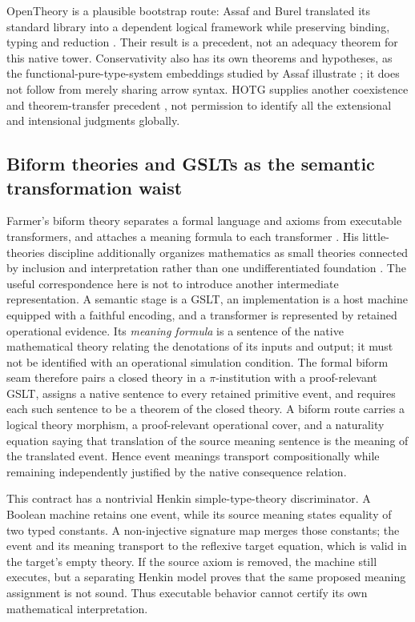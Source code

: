 \documentclass[11pt]{article}
\theoremstyle{definition}
\theoremstyle{remark}
\begin{document}
OpenTheory is a plausible bootstrap route: Assaf and Burel translated its
standard library into a dependent logical framework while preserving binding,
typing and reduction \cite{AssafBurelHOL}. Their result is a precedent, not
an adequacy theorem for this native tower. Conservativity also has its own
theorems and hypotheses, as the functional-pure-type-system embeddings studied
by Assaf illustrate \cite{AssafConservativity}; it does not follow from merely
sharing arrow syntax. HOTG supplies another coexistence and theorem-transfer
precedent \cite{BrownKaliszykPakHOTG}, not permission to identify all the
extensional and intensional judgments globally.

\subsection{Biform theories and GSLTs as the semantic transformation waist}
\label{sec:biform-gslt}

Farmer's biform theory separates a formal language and axioms from executable
transformers, and attaches a meaning formula to each transformer
\cite{CaretteFarmerSharodaBiform,FarmerMohrenschildtTransformers}.  His
little-theories discipline additionally organizes mathematics as small theories
connected by inclusion and interpretation rather than one undifferentiated
foundation \cite{FarmerLittleTheories}.  The useful
correspondence here is not to introduce another intermediate representation.
A semantic stage is a GSLT, an implementation is a host machine equipped with a
faithful encoding, and a transformer is represented by retained operational
evidence.  Its \emph{meaning formula} is a sentence of the native mathematical
theory relating the denotations of its inputs and output; it must not be
identified with an operational simulation condition.  The formal biform seam
therefore pairs a closed theory in a $\pi$-institution with a proof-relevant
GSLT, assigns a native sentence to every retained primitive event, and requires
each such sentence to be a theorem of the closed theory.  A biform route carries
a logical theory morphism, a proof-relevant operational cover, and a naturality
equation saying that translation of the source meaning sentence is the meaning
of the translated event.  Hence event meanings transport compositionally while
remaining independently justified by the native consequence relation.

This contract has a nontrivial Henkin simple-type-theory discriminator.  A
Boolean machine retains one event, while its source meaning states equality of
two typed constants.  A non-injective signature map merges those constants; the
event and its meaning transport to the reflexive target equation, which is
valid in the target's empty theory.  If the source axiom is removed, the machine
still executes, but a separating Henkin model
proves that the same proposed meaning assignment is not sound.  Thus executable
behavior cannot certify its own mathematical interpretation.
\end{document}
